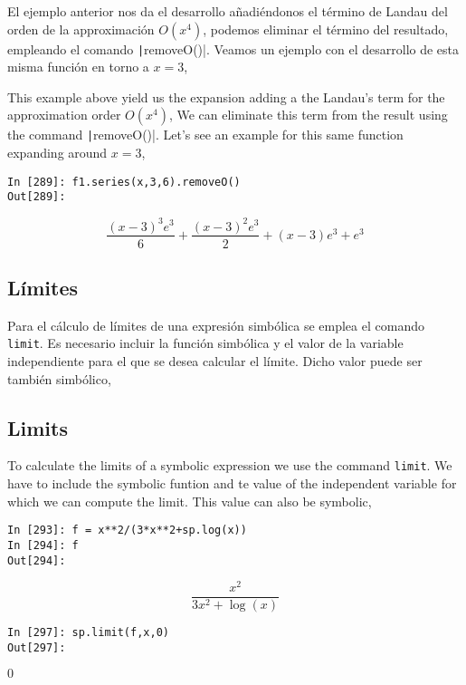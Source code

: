 \begin{paracol}{2}
El ejemplo anterior nos da el desarrollo añadiéndonos el término de Landau del orden de la approximación $O(x^4)$, podemos eliminar el término del resultado, empleando el comando \texttt|removeO()|. Veamos un ejemplo con el desarrollo de esta misma función en torno a $x=3$,

\switchcolumn
This example above yield us the expansion adding a the Landau's term for the approximation order $O(x^4)$, We can eliminate this term from the result using the command \texttt|removeO()|. Let's see an example for this same function expanding around $x=3$,
\end{paracol}
 
 
\begin{center}
	\begin{minipage}{.3\textwidth}
		\begin{verbatim}
In [289]: f1.series(x,3,6).removeO()
Out[289]: 
		\end{verbatim}
		\begin{equation*}			
			\frac{(x-3)^3e^3}{6}+\frac{(x-3)^2e^3}{2}+(x-3)e^3+e^3
		\end{equation*}
	\end{minipage}
\end{center}

\begin{paracol}{2}
\subsection{Límites} 
Para el cálculo de límites de una expresión simbólica se emplea el comando \texttt{limit}. Es necesario incluir la función simbólica y el valor de la variable independiente para el que se desea calcular el límite.  Dicho valor puede ser también simbólico,
\switchcolumn
\subsection{Limits} 
To calculate the limits of a symbolic expression we use the command \texttt{limit}. We have to include the symbolic funtion and te value of the independent variable for which we can compute the limit. This value can also be symbolic,
\end{paracol}

\begin{center}
	\begin{minipage}{.3\textwidth}
		\begin{verbatim}
In [293]: f = x**2/(3*x**2+sp.log(x))
In [294]: f
Out[294]:	
		\end{verbatim}
\begin{equation*}
\frac{x^2}{3x^2+\log(x)}	
\end{equation*}

\begin{verbatim}
In [297]: sp.limit(f,x,0)
Out[297]: 
		\end{verbatim}
		$0$
	\end{minipage}
\end{center}

